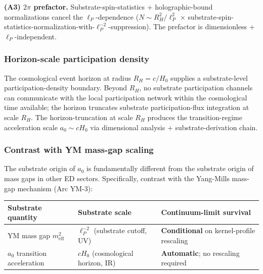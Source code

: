 \documentclass[
]{article}
\newcounter{none} %
\begin{document}
\textbf{(A3) \(2\pi\) prefactor.} Substrate-spin-statistics +
holographic-bound normalizations cancel the \(\ell_P\)-dependence
(\(N \sim R_H^2/\ell_P^2\) ×
substrate-spin-statistics-normalization-with-\(\ell_P^{-2}\)-suppression).
The prefactor is dimensionless + \(\ell_P\)-independent.

\subsubsection{Horizon-scale participation
density}\label{horizon-scale-participation-density}

The cosmological event horizon at radius \(R_H = c/H_0\) supplies a
substrate-level participation-density boundary. Beyond \(R_H\), no
substrate participation channels can communicate with the local
participation network within the cosmological time available; the
horizon truncates substrate participation-flux integration at scale
\(R_H\). The horizon-truncation at scale \(R_H\) produces the
transition-regime acceleration scale \(a_0 \sim cH_0\) via dimensional
analysis + substrate-derivation chain.

\subsubsection{Contrast with YM mass-gap
scaling}\label{contrast-with-ym-mass-gap-scaling}

The substrate origin of \(a_0\) is fundamentally different from the
substrate origin of mass gaps in other ED sectors. Specifically,
contrast with the Yang-Mills mass-gap mechanism (Arc YM-3):

{\def\LTcaptype{none} %
\begin{longtable}[]{@{}
  >{\raggedright\arraybackslash}p{}
  >{\raggedright\arraybackslash}p{}
  >{\raggedright\arraybackslash}p{}@{}}
\toprule\noalign{}
\begin{minipage}[b]{\linewidth}\raggedright
Substrate quantity
\end{minipage} & \begin{minipage}[b]{\linewidth}\raggedright
Substrate scale
\end{minipage} & \begin{minipage}[b]{\linewidth}\raggedright
Continuum-limit survival
\end{minipage} \\
\midrule\noalign{}
\endhead
\bottomrule\noalign{}
\endlastfoot
YM mass gap \(m_\mathrm{eff}^2\) & \(\ell_P^{-2}\) (substrate cutoff,
UV) & \textbf{Conditional} on kernel-profile rescaling \\
\(a_0\) transition acceleration & \(cH_0\) (cosmological horizon, IR) &
\textbf{Automatic}; no rescaling required \\
\end{longtable}
}
\end{document}
